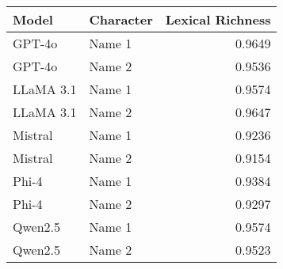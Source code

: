 \begin{tabular}{llr}
\toprule
Model & Character & Lexical Richness \\
\midrule
GPT-4o & Name 1 & 0.9649 \\
GPT-4o & Name 2 & 0.9536 \\
LLaMA 3.1 & Name 1 & 0.9574 \\
LLaMA 3.1 & Name 2 & 0.9647 \\
Mistral & Name 1 & 0.9236 \\
Mistral & Name 2 & 0.9154 \\
Phi-4 & Name 1 & 0.9384 \\
Phi-4 & Name 2 & 0.9297 \\
Qwen2.5 & Name 1 & 0.9574 \\
Qwen2.5 & Name 2 & 0.9523 \\
\bottomrule
\end{tabular}
